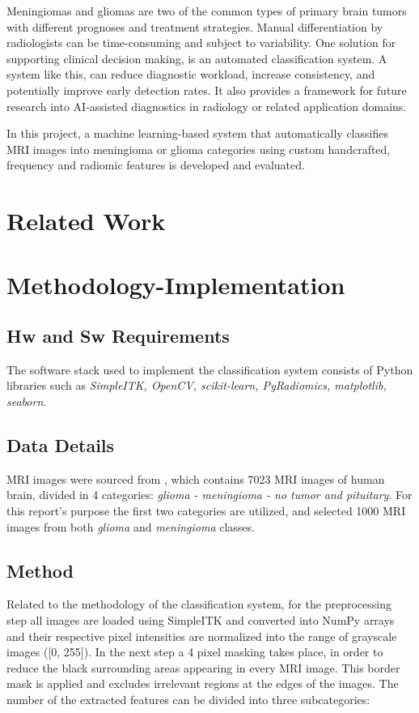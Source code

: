 \documentclass[11pt,a4paper]{report}
\begin{document}
Meningiomas and gliomas are two of the common types of primary brain tumors with 
different prognoses and treatment strategies. 
Manual differentiation by radiologists can be time-consuming 
and subject to variability. 
One solution for supporting clinical decision making, is an automated classification system.
A system like this, can reduce diagnostic workload, 
increase consistency, and potentially improve early detection rates. 
It also provides a framework for future research 
into AI-assisted diagnostics in radiology or related application domains.

In this project, a machine learning-based system that automatically 
classifies MRI images into meningioma or glioma categories 
using custom handcrafted, frequency and radiomic features 
is developed and evaluated.

\chapter{Related Work}

\chapter{Methodology-Implementation}
    \section{Hw and Sw Requirements}
	\par The software stack used to implement the classification system consists of Python libraries
	such as \textit{SimpleITK, OpenCV, scikit-learn, PyRadiomics, matplotlib, seaborn}.
    \section{Data Details}
	MRI images were sourced from \cite{data}, which contains 7023 MRI images of human brain, divided 
	in 4 categories: \textit{glioma - meningioma - no tumor and pituitary}.
	For this report's purpose the first two categories are utilized, and selected 1000 MRI images from both \textit{glioma} and
	\textit{meningioma} classes.

    \section{Method}
	
	\par Related to the methodology of the classification system, for the preprocessing step
	all images are loaded using SimpleITK
	and converted into NumPy arrays and their respective pixel intensities are 
	normalized into the range of grayscale images ([0, 255]).
	In the next step a 4 pixel masking takes place, in order to reduce the black surrounding areas
	appearing in every MRI image. This border mask is applied and excludes irrelevant regions at the 
	edges of the images. The number of the extracted features can be divided into three subcategories:
\end{document}
